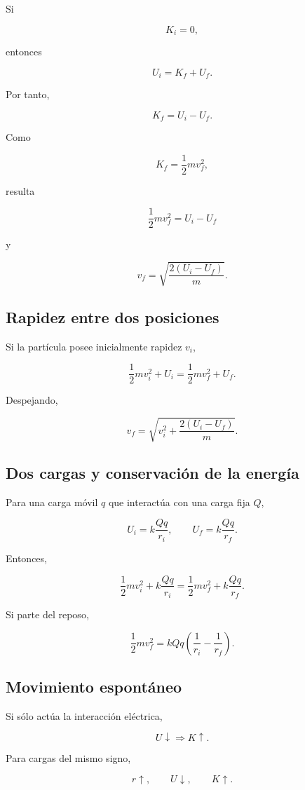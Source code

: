 Si

\[
K_i=0,
\]

entonces

\[
U_i=K_f+U_f.
\]

Por tanto,

\[
\boxed{
K_f=U_i-U_f
}.
\]

Como

\[
K_f=\frac12mv_f^2,
\]

resulta

\[
\boxed{
\frac12mv_f^2=U_i-U_f
}
\]

y

\[
\boxed{
v_f=
\sqrt{
\frac{2(U_i-U_f)}{m}
}
}.
\]


\subsection{Rapidez entre dos posiciones}

Si la partícula posee inicialmente rapidez \(v_i\),

\[
\frac12mv_i^2+U_i
=
\frac12mv_f^2+U_f.
\]

Despejando,

\[
\boxed{
v_f
=
\sqrt{
v_i^2+
\frac{2(U_i-U_f)}{m}
}
}.
\]


\subsection{Dos cargas y conservación de la energía}

Para una carga móvil \(q\) que interactúa con una carga fija \(Q\),

\[
U_i=k\frac{Qq}{r_i},
\qquad
U_f=k\frac{Qq}{r_f}.
\]

Entonces,

\[
\boxed{
\frac12mv_i^2
+
k\frac{Qq}{r_i}
=
\frac12mv_f^2
+
k\frac{Qq}{r_f}
}.
\]

Si parte del reposo,

\[
\boxed{
\frac12mv_f^2
=
kQq
\left(
\frac{1}{r_i}
-
\frac{1}{r_f}
\right)
}.
\]


\subsection{Movimiento espontáneo}

Si sólo actúa la interacción eléctrica,

\[
\boxed{
U\downarrow
\Longrightarrow
K\uparrow
}.
\]

Para cargas del mismo signo,

\[
\boxed{
r\uparrow,\qquad U\downarrow,\qquad K\uparrow
}.
\]

